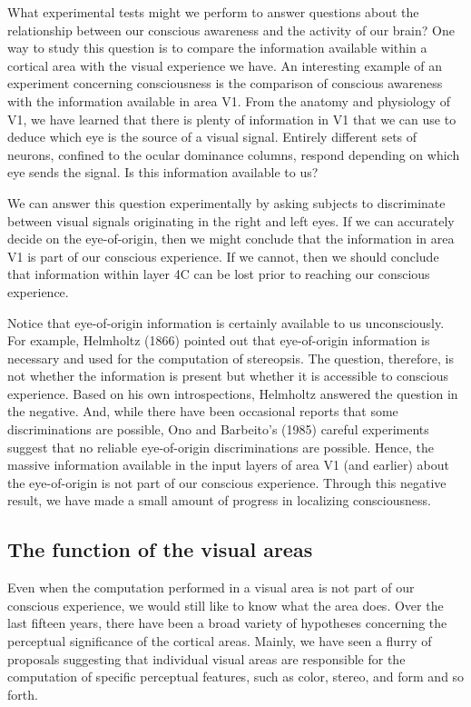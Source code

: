 What experimental tests
might we perform to answer questions about the relationship between
our conscious awareness and the activity of our brain?
One way to study this question is to compare the information available
within a cortical area with the visual experience we have.  An
interesting example of an experiment concerning
consciousness is the comparison of conscious awareness with
the information available in area V1.  
From the anatomy and physiology of V1, we have learned that
there is plenty of information in V1
that we can use to deduce which eye is the source of a
visual signal.  
Entirely different sets of neurons, confined to the
ocular dominance columns, respond depending on which eye sends the
signal.  
Is this information available to us?

We can answer this question experimentally
by asking subjects to
discriminate between visual signals originating in the right and left
eyes.
If we can accurately decide on the eye-of-origin,
then we might conclude that
the information in area V1 is part of our conscious
experience.
If we cannot, then we should conclude
that information within layer 4C can be lost
prior to reaching our conscious experience.

Notice that eye-of-origin information is certainly available to us
unconsciously.
For example, Helmholtz (1866) pointed out
that eye-of-origin information is necessary
and used for the computation of stereopsis.  The question, therefore,
is not whether the information is present but whether it is accessible
to conscious experience.  Based on his own introspections,
Helmholtz answered the question in the negative.  
And, while there have been occasional reports that some
discriminations are possible, Ono and Barbeito's (1985) 
careful experiments suggest that no reliable eye-of-origin discriminations
are possible.
Hence, the
massive information available in the input layers of area V1 (and
earlier) about the eye-of-origin is not part of our conscious
experience.
Through this negative result, we have made a small
amount of progress in localizing consciousness.

\subsection*{The function of the visual areas}
Even when the computation performed in a visual area is not
part of our conscious experience, we would still like to
know what the area does.
Over the last fifteen years,
there have been a broad variety of hypotheses concerning the
perceptual significance of the cortical areas.
Mainly, we have seen a flurry of proposals suggesting
that individual visual areas are responsible for
the computation of specific perceptual features,
such as color, stereo, and form and so forth.

